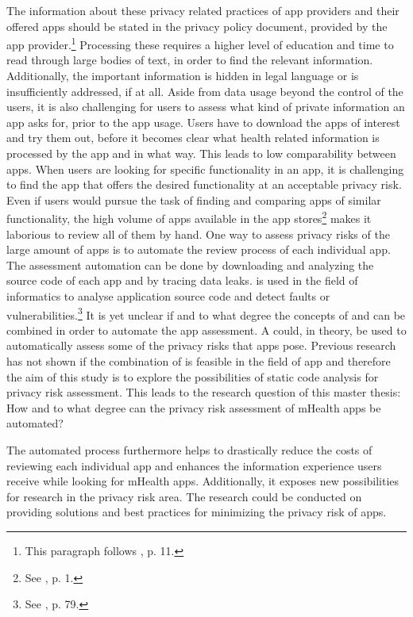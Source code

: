 \documentclass[
	a4paper,
	oneside,
	12pt,
	liststotocnumbered
]{article}
\let\cite\textcite
\begin{document}
The information about these privacy related practices of app providers and their offered apps should be stated in the privacy policy document, provided by the app provider.\footnote{This paragraph follows \cite{Dehling2014}, p. 11.}
Processing these \pps requires a higher level of education and time to read through large bodies of text, in order to find the relevant information. 
Additionally, the important information is hidden in legal language or is  insufficiently addressed, if at all.
Aside from data usage beyond the control of the users, it is also challenging for users to assess what kind of private information an app asks for, prior to the app usage. 
Users have to download the apps of interest and try them out, before it becomes clear what health related information is processed by the app and in what way. 
This leads to low comparability between apps. 
When users are looking for specific functionality in an \mH app, it is challenging to find the app that offers the desired functionality at an acceptable privacy risk. 
Even if users would pursue the task of finding and comparing \mH apps of similar functionality, the high volume of apps available in the app stores\footnote{See \cite{Enck2011}, p. 1.} makes it laborious to review all of them by hand.
One way to assess privacy risks of the large amount of \mH apps is to automate the review process of each individual app. 
The assessment automation can be done by downloading and analyzing the source code of each app and by tracing data leaks. 
\Sca is used in the field of informatics to analyse application source code and detect faults or vulnerabilities.\footnote{See \cite{Baca2008}, p. 79.} 
It is yet unclear if and to what degree the concepts of \sca and \pra can be combined in order to automate the app assessment.
A \sca could, in theory, be used to automatically assess some of the privacy risks that \mH apps pose.
Previous research has not shown if the combination of \sca is feasible in the field of \mH app \pra and therefore the aim of this study is to explore the possibilities of static code analysis for privacy risk assessment. 
This leads to the research question of this master thesis: How and to what degree can the privacy risk assessment of mHealth apps be automated?

The automated process furthermore helps to drastically reduce the costs of reviewing each individual app and enhances the information experience users receive while looking for mHealth apps.
Additionally, it exposes new possibilities for research in the privacy risk area. The research could be conducted on providing solutions and best practices for minimizing the privacy risk of apps.
\end{document}
